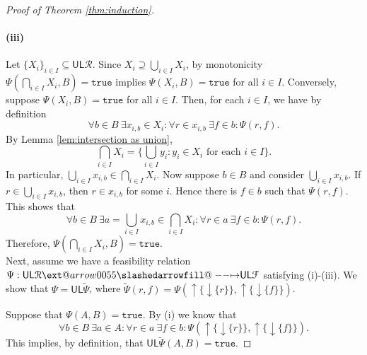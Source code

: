 \documentclass[12pt]{article}
\makeatletter
\theoremstyle{definition}
\theoremstyle{plain}
\theoremstyle{plain}
\theoremstyle{plain}
\theoremstyle{plain}
\theoremstyle{remark}
\theoremstyle{remark}
\newcommand{\mc}[1]{\mathcal{#1}}
\newcommand{\sub}{\subseteq}
\newcommand{\low}{\mathsf{L}}
\newcommand{\upper}{\mathsf{U}}
\newcommand{\true}{\mathtt{true}}
\newcommand{\upc}[1]{{\uparrow #1}}
\newcommand{\lwc}[1]{{\downarrow #1}}
\def\slashedarrowfill@#1#2#3#4#5{%
	$\m@th\thickmuskip0mu\medmuskip\thickmuskip\thinmuskip\thickmuskip
	\relax#5#1\mkern-7mu%
	\cleaders\hbox{$#5\mkern-2mu#2\mkern-2mu$}\hfill
	\mathclap{#3}\mathclap{#2}%
	\cleaders\hbox{$#5\mkern-2mu#2\mkern-2mu$}\hfill
	\mkern-7mu#4$%
}
\def\rightslashedarrowfill@{%
	\slashedarrowfill@\relbar\relbar\mapstochar\rightarrow}
\newcommand\xslashedrightarrow[2][]{%
	\ext@arrow 0055{\rightslashedarrowfill@}{#1}{#2}}
\makeatother
\begin{document}
\begin{proof}[Proof of Theorem \ref{thm:induction}]
	\paragraph{(iii)} Let $\{X_i\}_{i \in I} \sub \upper\low\mc{R}$. Since $X_i \supseteq \bigcup_{i \in I} X_i$, by monotonicity $\Psi(\bigcap_{i \in I}X_i,B) = \true$ implies $\Psi(X_i,B) = \true$ for all $i \in I$. Conversely, suppose $\Psi(X_i,B) = \true$ for all $i \in I$. Then, for each $i \in I$, we have by definition
	$$\forall b \in B \: \exists x_{i,b} \in X_i : \forall r \in x_{i,b} \: \exists f \in b : \Psi(r,f).$$
	By Lemma \ref{lem:intersection as union}, 
	$$\bigcap_{i \in I} X_i = \{ \bigcup_{i \in I} y_i :  y_i \in X_i \text{ for each } i \in I \}.$$
	In particular,  $\bigcup_{i \in I} x_{i,b} \in \bigcap_{i \in I} X_i$. Now suppose $b \in B$ and consider $\bigcup_{i \in I} x_{i,b}$. If $r \in \bigcup_{i \in I} x_{i,b}$, then $r \in x_{i,b}$ for some $i$. Hence there is $f \in b$ such that $\Psi(r,f)$. This shows that
	$$\forall b \in B \: \exists a = \bigcup_{i \in I} x_{i,b} \in \bigcap_{i \in I} X_i : \forall r \in a \: \exists f \in b : \Psi(r,f).$$
	Therefore, $\Psi(\bigcap_{i \in I}X_i,B) = \true$. \\
	
	Next, assume we have a feasibility relation $\Psi: \upper\low\mc{R} \xslashedrightarrow{} \upper\low\mc{F}$ satisfying (i)-(iii). We show that $\Psi = \upper\low\tilde\Psi$, where $\tilde\Psi(r,f) = \Psi(\upc\{\lwc{\{r\}}\},\upc\{\lwc{\{f\}}\})$.
	
	Suppose that $\Psi(A,B) = \true$. By (i) we know that $$\forall b \in B \: \exists a \in A : \forall r \in a \: \exists f \in b: \Psi(\upc\{\lwc{\{r\}}\},\upc\{\lwc{\{f\}}\}).$$ This implies, by definition, that $\upper\low\tilde\Psi(A,B) = \true$.
	

\end{proof}
\end{document}
